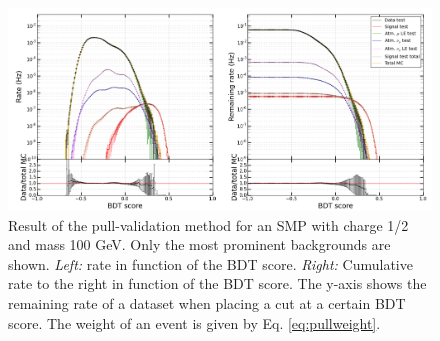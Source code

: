 \begin{figure}
\centering
\includegraphics[width=\textwidth]{chapter8/img/pullval_result2_signal_m_100_charge1ovr2.png}
\caption{Result of the pull-validation method for an SMP with charge 1/2 and mass 100 GeV. Only the most prominent backgrounds are shown. \textit{Left: }rate in function of the BDT score. \textit{Right: }Cumulative rate to the right in function of the BDT score. The y-axis shows the remaining rate of a dataset when placing a cut at a certain BDT score. The weight of an event is given by Eq. \ref{eq:pullweight}.}
\label{fig:pullval}
\end{figure}

